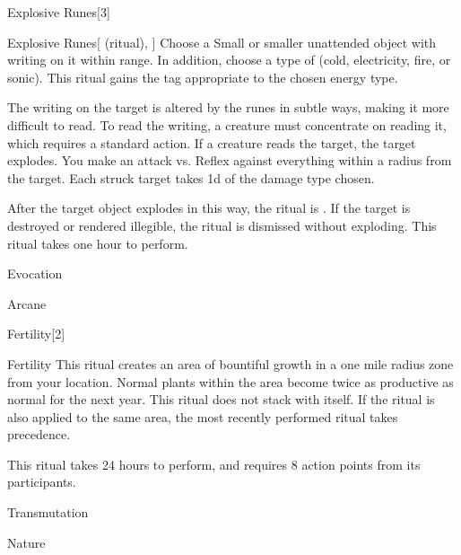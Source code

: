 \begin{spellsection}{Explosive Runes}[3]


\begin{ability}{Explosive Runes}[ (ritual), ]
Choose a Small or smaller unattended object with writing on it within \rngclose range.
In addition, choose a type of  (cold, electricity, fire, or sonic).
This ritual gains the tag appropriate to the chosen energy type.

The writing on the target is altered by the runes in subtle ways, making it more difficult to read.
To read the writing, a creature must concentrate on reading it, which requires a standard action.
If a creature reads the target, the target explodes.
You make an attack vs. Reflex against everything within a \areamed radius from the target.
Each struck target takes  \minus1d of the damage type chosen.

After the target object explodes in this way, the ritual is .
If the target is destroyed or rendered illegible, the ritual is dismissed without exploding.
This ritual takes one hour to perform.
\end{ability}




 Evocation

 Arcane
\end{spellsection}


\begin{spellsection}{Fertility}[2]


\begin{ability}{Fertility}
This ritual creates an area of bountiful growth in a one mile radius zone from your location.
Normal plants within the area become twice as productive as normal for the next year.
This ritual does not stack with itself.
If the  ritual is also applied to the same area, the most recently performed ritual takes precedence.

This ritual takes 24 hours to perform, and requires 8 action points from its participants.
\end{ability}




 Transmutation

 Nature
\end{spellsection}


